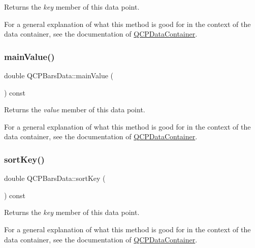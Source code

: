 Returns the {\itshape key} member of this data point.

For a general explanation of what this method is good for in the context of the data container, see the documentation of \hyperlink{classQCPDataContainer}{Q\+C\+P\+Data\+Container}. \mbox{\label{classQCPBarsData_a360d975e587f9e84259aaec172efb10b}} 
\subsubsection{\texorpdfstring{main\+Value()}{mainValue()}}
{\footnotesize\ttfamily double Q\+C\+P\+Bars\+Data\+::main\+Value (\begin{DoxyParamCaption}{ }\end{DoxyParamCaption}) const\hspace{0.3cm}{\ttfamily [inline]}}

Returns the {\itshape value} member of this data point.

For a general explanation of what this method is good for in the context of the data container, see the documentation of \hyperlink{classQCPDataContainer}{Q\+C\+P\+Data\+Container}. \mbox{\label{classQCPBarsData_a107d22d84f336bf6e3c3ad0133a5d2f6}} 
\subsubsection{\texorpdfstring{sort\+Key()}{sortKey()}}
{\footnotesize\ttfamily double Q\+C\+P\+Bars\+Data\+::sort\+Key (\begin{DoxyParamCaption}{ }\end{DoxyParamCaption}) const\hspace{0.3cm}{\ttfamily [inline]}}

Returns the {\itshape key} member of this data point.

For a general explanation of what this method is good for in the context of the data container, see the documentation of \hyperlink{classQCPDataContainer}{Q\+C\+P\+Data\+Container}. \mbox{\label{classQCPBarsData_aebaabda335bd4c9f81bd585d16b63aa8}} 
